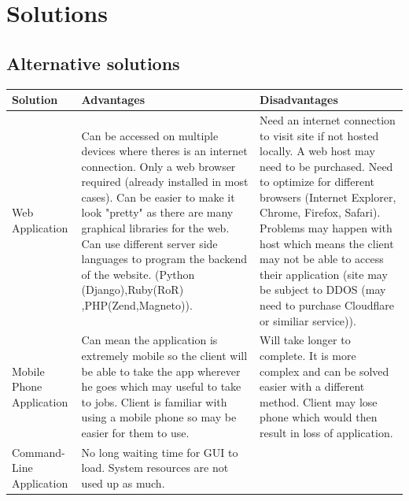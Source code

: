 \pagebreak
\section{Solutions}

\subsection{Alternative solutions}

\pagebreak
\begin{flushleft}
\begin{longtable}{|p{3cm}|p{4cm}|p{4cm}|}
\hline
\textbf{Solution} & \textbf{Advantages} & \textbf{Disadvantages} \\ \hline

Web Application &

{Can be accessed on multiple devices where theres is an internet connection.
Only a web browser required (already installed in most cases).
Can be easier to make it look "pretty" as there are many graphical libraries for the web.
Can use different server side languages to program the backend of the website. (Python (Django),Ruby(RoR)
\linebreak
,PHP(Zend,Magneto)).}&

{Need an internet connection to visit site if not hosted locally.
A web host may need to be purchased.
Need to optimize for different browsers (Internet Explorer, Chrome, Firefox, Safari).
Problems may happen with host which means the client may not be able to access their application (site may be subject to DDOS (may need to purchase Cloudflare or similiar service))}.

\\ \hline

Mobile Phone Application &

Can mean the application is extremely mobile so the client will be able to take the app wherever he goes which may useful to take to jobs.
Client is familiar with using a mobile phone so may be easier for them to use.&

Will take longer to complete.
It is more complex and can be solved easier with a different method.
Client may lose phone which would then result in loss of application.

\\ \hline

Command-Line Application &

No long waiting time for GUI to load.
System resources are not used up as much. &



\end{longtable}
\end{flushleft}
